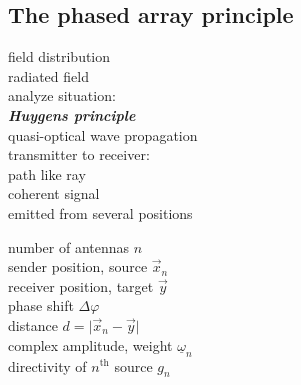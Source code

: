 \documentclass[
	final,
	a4paper,
	oneside,
	parskip=full,
	headings=standardclasses,
	headings=big,
	pointednumbers
]{scrartcl}
\newcommand{\bi}[1]{\textit{\textbf{#1}}}
\begin{document}
    \newpage
    \subsection{The phased array principle}

	\begin{minipage}[t]{0.5\textwidth}
        field distribution \\
        radiated field \\
        analyze situation: \\
        \bi{Huygens principle} \\
        quasi-optical wave propagation \\
        transmitter to receiver: \\
        path like ray \\ 
        coherent signal \\
        emitted from several positions
	\end{minipage}
	\begin{minipage}[t]{0.5\textwidth}
        number of antennas $n$ \\
        sender position, source $\vec{x}_n$ \\
        receiver position, target $\vec{y}$ \\
        phase shift $\Delta\varphi$ \\
        distance $d = \vert \vec{x}_n - \vec{y} \vert$\\
        complex amplitude, weight $\underline{\omega}_n$ \\
        directivity of $n^{\text{th}}$ source $g_n$
	\end{minipage}
\end{document}
